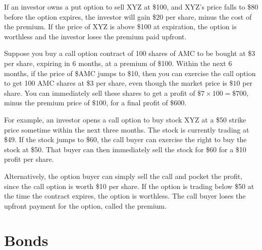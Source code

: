 \documentclass{article}
\begin{document}
      \begin{example}
        If an investor owns a put option to sell XYZ at \$100, and XYZ’s price falls to \$80 before the option expires, the investor will gain \$20 per share, minus the cost of the premium. If the price of XYZ is above \$100 at expiration, the option is worthless and the investor loses the premium paid upfront.
      \end{example}

      \begin{example}
        Suppose you buy a call option contract of 100 shares of AMC to be bought at \$3 per share, expiring in 6 months, at a premium of \$100. Within the next 6 months, if the price of \$AMC jumps to \$10, then you can exercise the call option to get 100 AMC shares at \$3 per share, even though the market price is $\$10$ per share. You can immediately sell these shares to get a profit of $\$7 \times 100 = \$700$, minus the premium price of $\$100$, for a final profit of $\$600$. 
      \end{example}

      \begin{example}
        For example, an investor opens a call option to buy stock XYZ at a \$50 strike price sometime within the next three months. The stock is currently trading at \$49. If the stock jumps to \$60, the call buyer can exercise the right to buy the stock at \$50. That buyer can then immediately sell the stock for \$60 for a \$10 profit per share. 
            
        Alternatively, the option buyer can simply sell the call and pocket the profit, since the call option is worth \$10 per share. If the option is trading below \$50 at the time the contract expires, the option is worthless. The call buyer loses the upfront payment for the option, called the premium.
      \end{example}

\section{Bonds}
\end{document}
